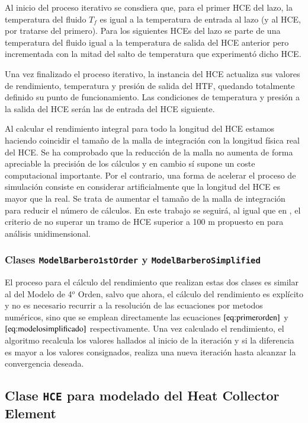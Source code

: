 Al inicio del proceso iterativo se consdiera que, para el primer HCE del lazo, la temperatura del fluido \(T_f\) es igual a la temperatura de entrada al lazo (y al HCE, por tratarse del primero). Para los siguientes HCEs del lazo se parte de una temperatura del fluido igual a la temperatura de salida del HCE anterior pero incrementada con la mitad del salto de temperatura que experimentó dicho HCE.

Una vez finalizado el proceso iterativo, la instancia del HCE actualiza sus valores de rendimiento, temperatura y presión de salida del HTF, quedando totalmente definido su punto de funcionamiento. Las condiciones de temperatura y presión a la salida del HCE serán las de entrada del HCE siguiente.

Al calcular el rendimiento integral para todo la longitud del HCE estamos haciendo coincidir el tamaño de la malla de integración con la longitud física real del HCE. Se ha comprobado que la reducción de la malla no aumenta de forma apreciable la precisión de los cálculos y en cambio sí supone un coste computacional importante. Por el contrario, una forma de acelerar el proceso de simulación consiste en considerar artificialmente que la longitud del HCE es mayor que la real. Se trata de aumentar el tamaño de la malla de integración para reducir el número de cálculos. En este trabajo se seguirá, al igual que en \cite{barberofresnoDesarrolloModeloTeorico2018}, el criterio de no superar un tramo de HCE superior a 100 m propuesto en \cite{forristallHeatTransferAnalysis2003} para análisis unidimensional. 

\subsubsection{Clases \texttt{ModelBarbero1stOrder}  y \texttt{ModelBarberoSimplified}}

El proceso para el cálculo del rendimiento que realizan estas dos clases es similar al del Modelo de 4$^o$ Orden, salvo que ahora, el cálculo del rendimiento es explícito y no es necesario recurrir a la resolución de las ecuaciones por metodos numéricos, sino que se emplean directamente las ecuaciones   \(\eqref{eq:primerorden}\) y \(\eqref{eq:modelosimplificado}\) respectivamente. Una vez calculado el rendimiento, el algoritmo recalcula los valores hallados al inicio de la iteración y si la diferencia es mayor a los valores consignados, realiza una nueva iteración hasta alcanzar la convergencia deseada.


\subsection{Clase \texttt{HCE} para modelado del Heat Collector Element}
\label{heat-collector-element-hce}

